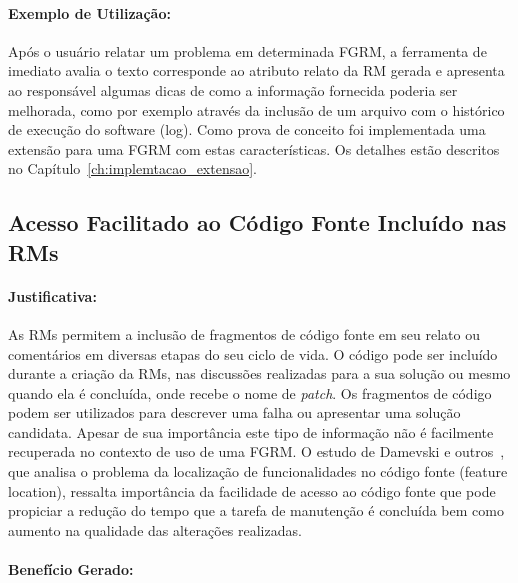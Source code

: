 \paragraph{Exemplo de Utilização:}
\label{par:exemplo_s01}

Após o usuário relatar um problema em determinada FGRM, a ferramenta de imediato
avalia o texto corresponde ao atributo relato da RM gerada e apresenta ao
responsável algumas dicas de como a informação fornecida poderia ser melhorada,
como por exemplo através da inclusão de um arquivo com o histórico de execução
do software (log). Como prova de conceito foi implementada uma extensão para uma
FGRM com estas características. Os detalhes estão descritos no
    Capítulo~\ref{ch:implemtacao_extensao}.

\subsection{Acesso Facilitado ao Código Fonte Incluído nas RMs}
\label{sub:busca_por_código_fonte}


\paragraph{Justificativa:}
\label{par:justificativa_s02}

As RMs permitem a inclusão de fragmentos de código fonte em seu relato ou
comentários em diversas etapas do seu ciclo de vida. O código pode ser incluído
durante a criação da RMs, nas discussões realizadas para a sua solução ou mesmo
quando ela é concluída, onde recebe o nome de \textit{patch}. Os fragmentos de
código podem ser utilizados para descrever uma falha ou apresentar uma solução
candidata. Apesar de sua importância este tipo de informação não é facilmente
recuperada no contexto de uso de uma FGRM\@. O estudo de Damevski e
outros~\cite{damevski2016field}, que analisa o problema da localização de
funcionalidades no código fonte (feature location), ressalta importância da
facilidade de acesso ao código fonte que pode propiciar a redução do tempo que a
tarefa de manutenção é concluída bem como aumento na qualidade das alterações
realizadas.

\paragraph{Benefício Gerado:}
\label{par:beneficios_s02}

